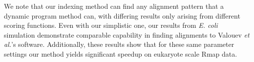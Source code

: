 We note that our indexing method can find any alignment pattern that a dynamic program method can, with differing results only arising from different scoring functions.  Even with our simplistic one, our results from \emph{E. coli} simulation demonstrate comparable capability in finding alignments to Valouev {\it et al.}'s software.  Additionally, these results show that for these same parameter settings our method yields significant speedup on eukaryote scale Rmap data.  



